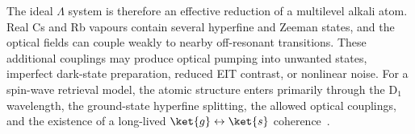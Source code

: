 The ideal $\Lambda$ system is therefore an effective reduction of a multilevel alkali atom. Real Cs and Rb vapours contain several hyperfine and Zeeman states, and the optical fields can couple weakly to nearby off-resonant transitions. These additional couplings may produce optical pumping into unwanted states, imperfect dark-state preparation, reduced EIT contrast, or nonlinear noise. For a spin-wave retrieval model, the atomic structure enters primarily through the D$_1$ wavelength, the ground-state hyperfine splitting, the allowed optical couplings, and the existence of a long-lived \(\ket{g}\leftrightarrow\ket{s}\) coherence~\cite{Apgteitiav_FinkelsteinEtAl_2023,Oqmboeit_MaEtAl_2017}.
